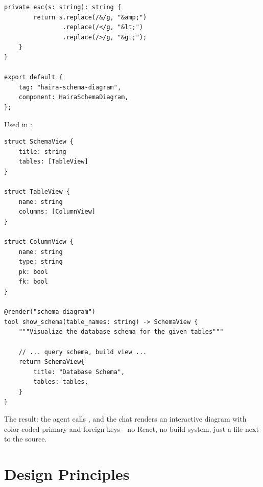 \begin{lstlisting}[language={}]
    private esc(s: string): string {
        return s.replace(/&/g, "&amp;")
                .replace(/</g, "&lt;")
                .replace(/>/g, "&gt;");
    }
}

export default {
    tag: "haira-schema-diagram",
    component: HairaSchemaDiagram,
};
\end{lstlisting}

Used in \haira{}:

\begin{lstlisting}
struct SchemaView {
    title: string
    tables: [TableView]
}

struct TableView {
    name: string
    columns: [ColumnView]
}

struct ColumnView {
    name: string
    type: string
    pk: bool
    fk: bool
}

@render("schema-diagram")
tool show_schema(table_names: string) -> SchemaView {
    """Visualize the database schema for the given tables"""

    // ... query schema, build view ...
    return SchemaView{
        title: "Database Schema",
        tables: tables,
    }
}
\end{lstlisting}

The result: the agent calls , and the chat renders an interactive diagram with color-coded primary and foreign keys---no React, no build system, just a  file next to the  source.

\section{Design Principles}

